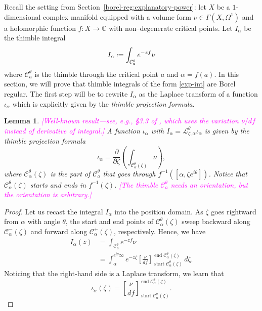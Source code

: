 \documentclass{article}
\newcommand{\C}{\mathbb{C}}
\newcommand*{\defeq}{\mathrel{\vcenter{\baselineskip0.5ex \lineskiplimit0pt
                     \hbox{\scriptsize.}\hbox{\scriptsize.}}}%
                     =}
\newcommand{\laplace}{\mathcal{L}}
\theoremstyle{definition}
\theoremstyle{plain}
\newtheorem{lemma}[definition]{Lemma}
\begin{document}
Recall the setting from Section~\ref{borel-reg:explanatory-power}: let $X$ be a $1$-dimensional complex manifold equipped with a volume form $\nu\in\Gamma(X,\Omega^1)$ and a holomorphic function $f\colon X\to\C$ with non--degenerate critical points. Let $I_\alpha$ be the thimble integral 
\begin{equation}\label{exp-int}
I_\alpha \defeq \int_{\mathcal{C}_a^\theta} e^{-zf} \nu
\end{equation}
where $\mathcal{C}_a^\theta$ is the thimble through the critical point $a$ and $\alpha=f(a)$. In this section, we will prove that thimble integrals of the form \eqref{exp-int} are Borel regular. The first step will be to rewrite $I_\alpha$ as the Laplace transform of a function $\iota_\alpha$ which is explicitly given by the \textit{thimble projection formula}.%
\begin{lemma}\label{lem:thimble_proj_formula-proof}
\textcolor{magenta}{[Well-known result---see, e.g., \S 3.3 of \cite{pham}, which uses the variation $\nu/df$ instead of derivative of integral.]} A function $\iota_\alpha$ with $I_\alpha = \laplace_{\zeta, \alpha}^\theta \iota_\alpha$ is given by the {\em thimble projection formula}
\begin{equation}\label{eqn:formula-proof}
    \iota_\alpha = \frac{\partial}{\partial \zeta} \left( \int_{\mathcal{C}_\alpha^\theta(\zeta)}\nu \right),
\end{equation}
where $\mathcal{C}_\alpha^\theta(\zeta)$ is the part of $\mathcal{C}_a^\theta$ that goes through $f^{-1}([\alpha,\zeta e^{i\theta}])$. Notice that $\mathcal{C}_\alpha^\theta(\zeta)$ starts and ends in $f^{-1}(\zeta)$. \textcolor{magenta}{[The thimble $\mathcal{C}_a^\theta$ needs an orientation, but the orientation is arbitrary.]}
\end{lemma}
\begin{proof}
    Let us recast the integral $I_\alpha$ into the position domain. As $\zeta$ goes rightward from $\alpha$ with angle $\theta$, the start and end points of $\mathcal{C}_\alpha^\theta(\zeta)$ sweep backward along $\mathcal{C}^-_\alpha(\zeta)$ and forward along $\mathcal{C}^+_\alpha(\zeta)$, respectively. Hence, we have
\begin{align*}
I_\alpha(z) & = \int_{\mathcal{C}_a^\theta} e^{-zf} \nu \\
& = \int_{\alpha}^{e^{i\theta} \infty} e^{-z\zeta} \left[\frac{\nu}{df}\right]_{\operatorname{start} \mathcal{C}_\alpha^\theta(\zeta)}^{\operatorname{end} \mathcal{C}_\alpha^\theta(\zeta)}\,d\zeta.
\end{align*}
Noticing that the right-hand side is a Laplace transform, we learn that
\begin{equation}\label{thimble-difference}
{\iota}_\alpha(\zeta) = \left[\frac{\nu}{df}\right]_{\operatorname{start} \mathcal{C}_\alpha^\theta(\zeta)}^{\operatorname{end} \mathcal{C}_\alpha^\theta(\zeta)}.
\end{equation}
\end{proof}
\end{document}
